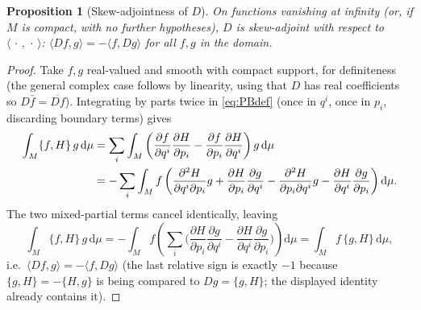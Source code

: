\documentclass[11pt]{article}
\newtheorem{proposition}{Proposition}[section]
\theoremstyle{remark}
\newcommand{\PB}[2]{\{#1,#2\}}
\newcommand{\dd}{\mathrm{d}}
\begin{document}
\begin{proposition}[Skew-adjointness of $D$]
\label{prop:skew}
On functions vanishing at infinity (or, if $M$ is compact, with no further hypotheses), $D$ is skew-adjoint with respect to $\langle\,\cdot\,,\,\cdot\,\rangle$: $\langle Df,g\rangle = -\langle f,Dg\rangle$ for all $f,g$ in the domain.
\end{proposition}
\begin{proof}
Take $f,g$ real-valued and smooth with compact support, for definiteness (the general complex case follows by linearity, using that $D$ has real coefficients so $D\bar f=\overline{Df}$). Integrating by parts twice in \eqref{eq:PBdef} (once in $q^i$, once in $p_i$, discarding boundary terms) gives
\begin{align}
\int_M \PB{f}{H}\,g\,\dd\mu
&= \sum_i\int_M\left(\frac{\partial f}{\partial q^i}\frac{\partial H}{\partial p_i}-\frac{\partial f}{\partial p_i}\frac{\partial H}{\partial q^i}\right)g\,\dd\mu \notag\\
&= -\sum_i\int_M f\left(\frac{\partial^2H}{\partial q^i\partial p_i}g+\frac{\partial H}{\partial p_i}\frac{\partial g}{\partial q^i}-\frac{\partial^2H}{\partial p_i\partial q^i}g-\frac{\partial H}{\partial q^i}\frac{\partial g}{\partial p_i}\right)\dd\mu.
\end{align}
The two mixed-partial terms cancel identically, leaving
\begin{equation}
\int_M \PB{f}{H}\,g\,\dd\mu = -\int_M f\left(\sum_i\Big(\frac{\partial H}{\partial p_i}\frac{\partial g}{\partial q^i}-\frac{\partial H}{\partial q^i}\frac{\partial g}{\partial p_i}\Big)\right)\dd\mu = \int_M f\,\PB{g}{H}\,\dd\mu,
\end{equation}
i.e.\ $\langle Df,g\rangle = -\langle f, Dg\rangle$ (the last relative sign is exactly $-1$ because $\PB{g}{H}=-\PB{H}{g}$ is being compared to $D g = \PB{g}{H}$; the displayed identity already contains it).
\end{proof}
\end{document}
